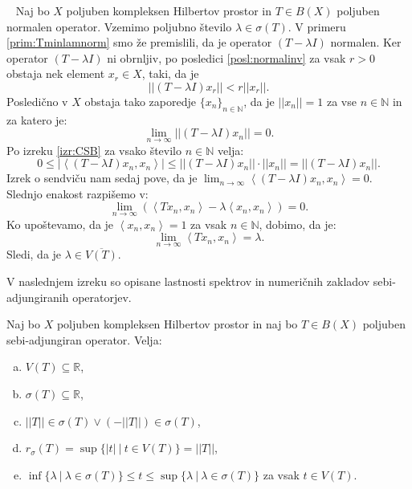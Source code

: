 \documentclass[12pt,a4paper,oneside,fleqn,openany]{book}
\newcommand{\eopf}{\raisebox{0.8ex}{\framebox{}}} %
\newenvironment{dokaz}%
{\noindent{\bf Dokaz.}\ }%
{\hfill\eopf\par\bigskip}%
\newcommand{\R}{\mathbb{R}}
\newcommand{\N}{\mathbb{N}}
\newcommand{\abs}[1]{\ensuremath{\lvert #1 \rvert}}
\newcommand{\norm}[1]{\abs{\abs{#1}}}
\newcommand{\Sp}[2]{\ensuremath{\left<#1, #2\right>}}
\begin{document}
\begin{dokaz}
	Naj bo $X$ poljuben kompleksen Hilbertov prostor in $T\in B(X)$ poljuben normalen operator. Vzemimo poljubno število $\lambda\in\sigma(T)$. V primeru \ref{prim:Tminlamnorm} smo že premislili, da je operator $(T-\lambda I)$ normalen. Ker operator $(T - \lambda I)$ ni obrnljiv, po posledici \ref{posl:normalinv} za vsak $r>0$ obstaja nek element $x_r\in X$, taki, da je $$\norm{(T-\lambda I)x_r}< r\norm{x_r}.$$ Posledično v $X$ obstaja tako zaporedje $\{x_n\}_{n\in\N}$, da je $\norm{x_n} = 1$ za vse $n\in\N$ in za katero je: $$\lim_{n\to\infty}\norm{(T-\lambda I)x_n} = 0.$$
	Po izreku \ref{izr:CSB} za vsako število $n\in\N$ velja: $$0\leq\abs{\Sp{(T-\lambda I)x_n}{x_n}} \leq \norm{(T-\lambda I)x_n}\cdot\norm{x_n} = \norm{(T-\lambda I)x_n}.$$ Izrek o sendviču nam sedaj pove, da je $\lim_{n\to\infty}\Sp{(T-\lambda I)x_n}{x_n} = 0$. Slednjo enakost razpišemo v: $$\lim_{n\to\infty}(\Sp{Tx_n}{x_n}-\lambda\Sp{x_n}{x_n})=0.$$ Ko upoštevamo, da je $\Sp{x_n}{x_n} = 1$ za vsak $n\in\N$, dobimo, da je: $$\lim_{n\to\infty}\Sp{Tx_n}{x_n} = \lambda.$$ Sledi, da je $\lambda \in \overline{V(T)}$.
\end{dokaz}

V naslednjem izreku so opisane lastnosti spektrov in numeričnih zakladov sebi-adjungiranih operatorjev.

\begin{izrek}
	\label{izr:sebiadjnumraz}
	Naj bo $X$ poljuben kompleksen Hilbertov prostor in naj bo $T\in B(X)$ poljuben sebi-adjungiran operator. Velja: \begin{enumerate}[a)]
		\item $V(T)\subseteq \R$,
		\item $\sigma(T)\subseteq \R$,
		\item $\norm{T}\in\sigma(T)\lor (-\norm{T})\in\sigma(T)$,
		\item $r_\sigma(T)=\sup\{\abs{t}~|~t\in V(T)\} = \norm{T}$,
		\item $\inf\{\lambda~|~\lambda\in\sigma(T)\} \leq t \leq \sup\{\lambda~|~\lambda\in\sigma(T)\}$ za vsak $t\in V(T)$.
	\end{enumerate}
\end{izrek}
\end{document}
